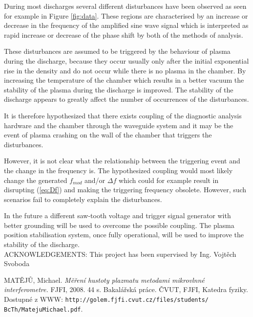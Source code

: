 \documentclass[a4paper,twoside]{articlek}
\begin{document}
During most discharges several different disturbances have been observed as seen for example in Figure \ref{fig:data}. These regions are characterised by an increase or decrease in the frequency of the amplified sine wave signal which is interpreted as rapid increase or decrease of the phase shift by both of the methods of analysis.

These disturbances are assumed to be triggered by the behaviour of plasma during the discharge, because they occur usually only after the initial exponential rise in the density and do not occur while there is no plasma in the chamber. By increasing the temperature of the chamber which results in a better vacuum the stability of the plasma during the discharge is improved. The stability of the discharge appears to greatly affect the number of occurrences of the disturbances.

It is therefore hypothesized that there exists coupling of the diagnostic analysis hardware and the chamber through the waveguide system and it may be the event of plasma crashing on the wall of the chamber that triggers the disturbances.

However, it is not clear what the relationship between the triggering event and the change in the frequency is. The hypothesized coupling would most likely change the generated $f_{mod}$ and/or $\Delta f$ which could for example result in disrupting (\ref{eq:Df}) and making the triggering frequency obsolete. However, such scenarios fail to completely explain the disturbances.

In the future a different saw-tooth voltage and trigger signal generator with better grounding will be used to overcome the possible coupling. The plasma position stabilisation system, once fully operational, will be used to improve the stability of the discharge.\\

\noindent ACKNOWLEDGEMENTS: This project has been supervised by Ing. Vojtěch Svoboda 


\begin{thebibliography}{99}
   MATĚJŮ, Michael.
   {\em Měření hustoty plazmatu metodami mikrovlnné interferometre. }
   FJFI, 2008. 44 s. Bakalářská práce. ČVUT, FJFI, Katedra fyziky. Dostupné z WWW: {\tt http://golem.fjfi.cvut.cz/files/students/
   BcTh/MatejuMichael.pdf}.
\end{thebibliography}
\end{document}
